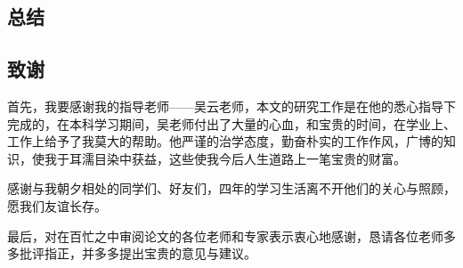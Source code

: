 \documentclass[12pt,a4paper]{article}
\begin{document}
\begin{CJK*}{UTF8}{gbsn}
\begin{spacing}{1.8}
\section{总结}


\end{spacing}

\begin{spacing}{1.7}
\section{致谢}
首先，我要感谢我的指导老师——吴云老师，本文的研究工作是在他的悉心指导下完成的，在本科学习期间，吴老师付出了大量的心血，和宝贵的时间，在学业上、工作上给予了我莫大的帮助。他严谨的治学态度，勤奋朴实的工作作风，广博的知识，使我于耳濡目染中获益，这些使我今后人生道路上一笔宝贵的财富。

感谢与我朝夕相处的同学们、好友们，四年的学习生活离不开他们的关心与照顾，愿我们友谊长存。

最后，对在百忙之中审阅论文的各位老师和专家表示衷心地感谢，恳请各位老师多多批评指正，并多多提出宝贵的意见与建议。
\end{spacing}

\end{CJK*}
\end{document}
